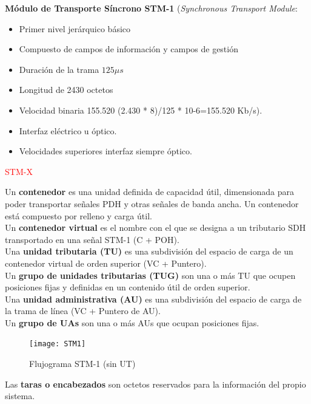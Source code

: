 \documentclass[10pt,portrait, twocolumn]{article}
\begin{document}
\textbf{Módulo de Transporte Síncrono STM-1} (\textit{Synchronous Transport Module}:

	\begin{itemize}
	\item Primer nivel jerárquico básico
	\item Compuesto de campos de información y campos de gestión
	\item Duración de la trama $125 \mu s$
	\item Longitud de 2430 octetos
	\item Velocidad binaria 155.520 (2.430 * 8)/125 * 10-6=155.520 Kb/s).
	\item Interfaz eléctrico u óptico.
	\item Velocidades superiores interfaz siempre óptico.
	\end{itemize}
	
\textcolor{red}{STM-X}

Un \textbf{contenedor} es una unidad definida de capacidad útil, dimensionada para poder transportar señales PDH y otras señales de banda ancha. Un contenedor está compuesto por relleno y carga útil.\\

Un \textbf{contenedor virtual} es el nombre con el que se designa a un tributario SDH transportado en una señal STM-1 (C + POH).\\

Una \textbf{unidad tributaria (TU)} es una subdivisión del espacio de carga de un contenedor virtual de orden superior (VC + Puntero).\\

Un \textbf{grupo de unidades tributarias (TUG)} son una o más TU que ocupen posiciones fijas y definidas en un contenido útil de orden superior.\\

Una \textbf{unidad administrativa (AU)} es una subdivisión del espacio de carga de la trama de línea (VC + Puntero de AU).\\

Un \textbf{grupo de UAs} son una o más AUs que ocupan posiciones fijas.

\begin{figure}[h]
	\centering
     \texttt{[image: STM1]}
      \caption{Flujograma STM-1 (sin UT)}
      \label{fig:STM1}
\end{figure}

Las \textbf{taras o encabezados} son octetos reservados para la información del propio sistema.
\end{document}
